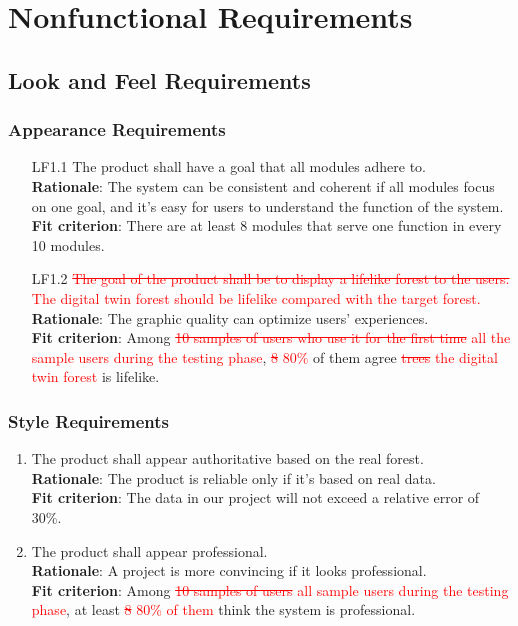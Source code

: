 \documentclass{article}
\begin{document}



\section{Nonfunctional Requirements}
\subsection{Look and Feel Requirements}
\subsubsection{Appearance Requirements}
\begin{enumerate}
    \item[LF1.1] The product shall have a goal that all modules adhere to. \\
    \textbf{Rationale}: The system can be consistent and coherent if all modules focus on one goal, and
     it's easy for users to understand the function of the system.\\
    \textbf{Fit criterion}:  There are at least 8 modules that serve one function in every 10 modules.
   
    \item[LF1.2] \textcolor{red}{\st{The goal of the product shall be to display a lifelike forest to
     the users.} The digital twin forest should be lifelike compared with the target
     forest.}\\
    \textbf{Rationale}: The graphic quality can optimize users' experiences.\\
    \textbf{Fit criterion}: Among \textcolor{red}{\st{10 samples of users who use it for the first
     time} all the sample users during the testing phase}, \textcolor{red}{\st{8} 80\%} of them agree
      \textcolor{red}{\st{trees} the digital twin forest} is lifelike.
\end{enumerate}
\subsubsection{Style Requirements}
\begin{enumerate}[LF2.1]
    \item The product shall appear authoritative based on the real forest.\\
    \textbf{Rationale}: The product is reliable only if it's based on real data.\\
    \textbf{Fit criterion}: The data in our project will not exceed a relative error of 30\%.
    
    \item The product shall appear professional.\\
    \textbf{Rationale}: A project is more convincing if it looks professional.\\
    \textbf{Fit criterion}: Among \textcolor{red}{\st{10 samples of users} all sample users during the 
    testing phase}, at least \textcolor{red}{\st{8} 80\% of them} think the system is professional.
\end{enumerate}
\end{document}
